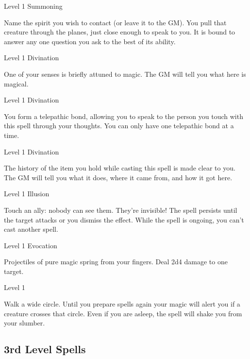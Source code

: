 \startSpellName
          	Level 1	Summoning
\stopSpellName
       

Name the spirit you wish to contact (or leave it to the GM). You pull that creature through the planes, just close enough to speak to you. It is bound to answer any one question you ask to the best of its ability.

       
\startSpellName
          	Level 1	Divination
\stopSpellName
       

One of your senses is briefly attuned to magic. The GM will tell you what here is magical.

       
\startSpellName
          	Level 1	Divination
\stopSpellName
       

You form a telepathic bond, allowing you to speak to the person you touch with this spell through your thoughts. You can only have one telepathic bond at a time.

       
\startSpellName
          	Level 1	Divination
\stopSpellName
       

The history of the item you hold while casting this spell is made clear to you. The GM will tell you what it does, where it came from, and how it got here.

       
\startSpellName
          	Level 1	Illusion
\stopSpellName
       

Touch an ally: nobody can see them. They're invisible! The spell persists until the target attacks or you dismiss the effect. While the spell is ongoing, you can't cast another spell.

       
\startSpellName
          	Level 1	Evocation
\stopSpellName
       

Projectiles of pure magic spring from your fingers. Deal 2d4 damage to one target.

       
\startSpellName
          	Level 1
\stopSpellName
       

Walk a wide circle. Until you prepare spells again your magic will alert you if a creature crosses that circle. Even if you are asleep, the spell will shake you from your slumber.

     

     

       
\subsection{3rd Level Spells}     
       
